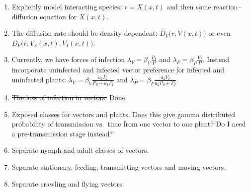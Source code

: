 \documentclass{article}
\begin{document}
\begin{enumerate}
\item Explicitly model interacting species: $r = X(x, t)$ and then
  some reaction--diffusion equation for $X(x, t)$.
\item The diffusion rate should be density dependent:
  $D_V\big(r, V(x, t)\big)$ or even
  $D_V\big(r, V_S(x, t), V_I(x, t)\big)$.
\item Currently, we have forces of infection
  $\lambda_V = \beta_V \frac{P_I}{P}$ and
  $\lambda_P = \beta_P \frac{V_I}{P}$.  Instead incorporate uninfected
  and infected vector preference for infected and uninfected plants:
  $\lambda_V = \beta_V \frac{a_1 P_I}{P_S + a_1 P_I}$ and
  $\lambda_P = \beta_P \frac{a_2 V_I}{a_2 P_S + P_I}$.
\item \sout{The loss of infection in vectors.}  Done.
\item Exposed classes for vectors and plants.  Does this give gamma
  distributed probability of transmission vs.~time from one vector to
  one plant?  Do I need a pre-transmission stage instead?
\item Separate nymph and adult classes of vectors.
\item Separate stationary, feeding, transmitting vectors and moving
  vectors.
\item Separate crawling and flying vectors.
\end{enumerate}
\end{document}
